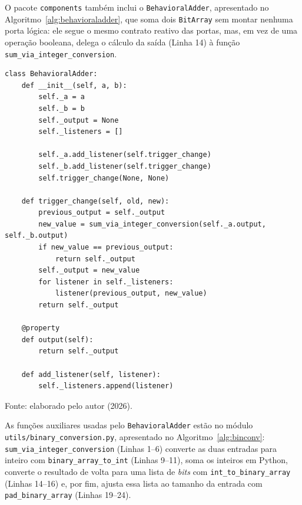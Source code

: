 O pacote \texttt{components} também inclui o \texttt{BehavioralAdder}, apresentado no Algoritmo~\ref{alg:behavioraladder}, que soma dois \texttt{BitArray} sem montar nenhuma porta lógica: ele segue o mesmo contrato reativo das portas, mas, em vez de uma operação booleana, delega o cálculo da saída (Linha 14) à função \texttt{sum\_via\_integer\_conversion}.

\begin{algoritmo}[H]
\caption{BehavioralAdder (components/behavioral\_adder.py).}
\label{alg:behavioraladder}
\begin{verbatim}
class BehavioralAdder:
    def __init__(self, a, b):
        self._a = a
        self._b = b
        self._output = None
        self._listeners = []

        self._a.add_listener(self.trigger_change)
        self._b.add_listener(self.trigger_change)
        self.trigger_change(None, None)

    def trigger_change(self, old, new):
        previous_output = self._output
        new_value = sum_via_integer_conversion(self._a.output, self._b.output)
        if new_value == previous_output:
            return self._output
        self._output = new_value
        for listener in self._listeners:
            listener(previous_output, new_value)
        return self._output

    @property
    def output(self):
        return self._output

    def add_listener(self, listener):
        self._listeners.append(listener)
\end{verbatim}
\begin{center}
\footnotesize Fonte: elaborado pelo autor (2026).
\end{center}
\end{algoritmo}

\begin{sloppypar}
As funções auxiliares usadas pelo \texttt{BehavioralAdder} estão no módulo \texttt{utils/\allowbreak binary\_conversion.py}, apresentado no Algoritmo~\ref{alg:binconv}: \texttt{sum\_via\_integer\_conversion} (Linhas 1--6) converte as duas entradas para inteiro com \texttt{binary\_array\_to\_int} (Linhas 9--11), soma os inteiros em Python, converte o resultado de volta para uma lista de \textit{bits} com \texttt{int\_to\_binary\_array} (Linhas 14--16) e, por fim, ajusta essa lista ao tamanho da entrada com \texttt{pad\_binary\_array} (Linhas 19--24).
\end{sloppypar}

